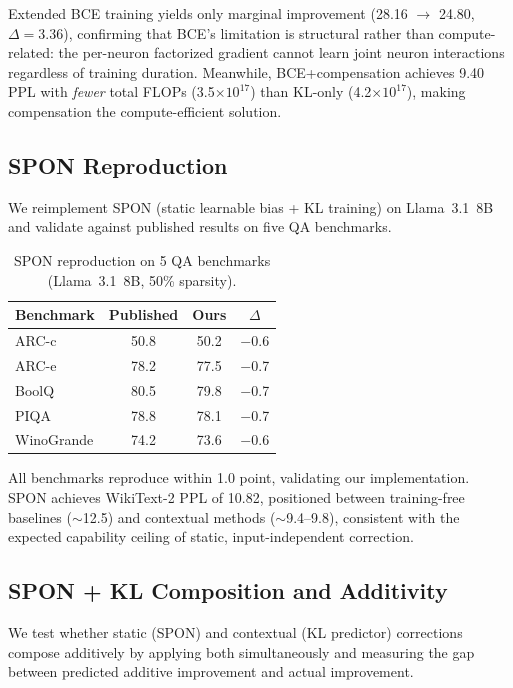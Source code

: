 \documentclass[11pt]{article}
\begin{document}
Extended BCE training yields only marginal improvement (28.16 $\to$ 24.80, $\Delta = 3.36$), confirming that BCE's limitation is structural rather than compute-related: the per-neuron factorized gradient cannot learn joint neuron interactions regardless of training duration.
Meanwhile, BCE+compensation achieves 9.40 PPL with \emph{fewer} total FLOPs (3.5$\times 10^{17}$) than KL-only (4.2$\times 10^{17}$), making compensation the compute-efficient solution.

\subsection{SPON Reproduction}

We reimplement SPON (static learnable bias + KL training) on Llama~3.1~8B and validate against published results on five QA benchmarks.

\begin{table}[h]
\centering
\caption{SPON reproduction on 5 QA benchmarks (Llama~3.1~8B, 50\% sparsity).}
\label{tab:spon_repro}
\small
\begin{tabular}{lccc}
\toprule
Benchmark & Published & Ours & $\Delta$ \\
\midrule
ARC-c & 50.8 & 50.2 & $-$0.6 \\
ARC-e & 78.2 & 77.5 & $-$0.7 \\
BoolQ & 80.5 & 79.8 & $-$0.7 \\
PIQA & 78.8 & 78.1 & $-$0.7 \\
WinoGrande & 74.2 & 73.6 & $-$0.6 \\
\bottomrule
\end{tabular}
\end{table}

All benchmarks reproduce within 1.0 point, validating our implementation.
SPON achieves WikiText-2 PPL of 10.82, positioned between training-free baselines ($\sim$12.5) and contextual methods ($\sim$9.4--9.8), consistent with the expected capability ceiling of static, input-independent correction.

\subsection{SPON + KL Composition and Additivity}

We test whether static (SPON) and contextual (KL predictor) corrections compose additively by applying both simultaneously and measuring the gap between predicted additive improvement and actual improvement.
\end{document}
